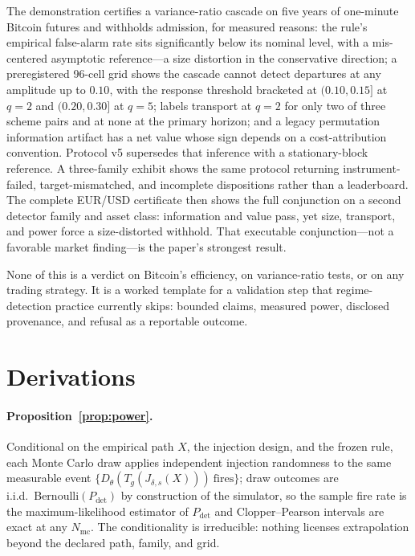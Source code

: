 \documentclass[3p]{elsarticle}
\newcommand{\Pdet}{\ensuremath{P_{\mathrm{det}}}}
\begin{document}
The demonstration certifies a variance-ratio cascade on five years of
one-minute Bitcoin futures and withholds admission, for measured reasons:
the rule's empirical false-alarm rate sits significantly below its nominal
level, with a mis-centered asymptotic reference---a size distortion in the
conservative direction; a preregistered 96-cell grid shows the cascade
cannot detect departures at any amplitude up to $0.10$, with the response
threshold bracketed at $(0.10,0.15]$ at $q{=}2$ and $(0.20,0.30]$ at
$q{=}5$; labels transport at $q{=}2$ for only two of three scheme pairs and
at none at the primary horizon; and a legacy permutation information artifact
has a net value whose sign depends on a cost-attribution convention. Protocol
v5 supersedes that inference with a stationary-block reference. A three-family exhibit shows the
same protocol returning instrument-failed, target-mismatched, and incomplete
dispositions rather than a leaderboard. The complete EUR/USD certificate
then shows the full conjunction on a second detector family and asset class:
information and value pass, yet size, transport, and power force a
size-distorted withhold. That executable conjunction---not a favorable market
finding---is the paper's strongest result.

None of this is a verdict on Bitcoin's efficiency, on variance-ratio tests,
or on any trading strategy. It is a worked template for a validation step
that regime-detection practice currently skips: bounded claims, measured
power, disclosed provenance, and refusal as a reportable outcome.

\appendix

\section{Derivations}
\label{app:derivations}

\paragraph{Proposition~\ref{prop:power}.} Conditional on the empirical path
$X$, the injection design, and the frozen rule, each Monte Carlo draw applies
independent injection randomness to the same measurable event
$\{D_\theta(T_g(J_{\delta,s}(X)))\ \text{fires}\}$; draw outcomes are
i.i.d.\ Bernoulli$(\Pdet)$ by construction of the simulator, so the sample
fire rate is the maximum-likelihood estimator of $\Pdet$ and Clopper--Pearson
intervals are exact at any $N_{\mathrm{mc}}$. The conditionality is
irreducible: nothing licenses extrapolation beyond the declared path, family,
and grid.
\end{document}
